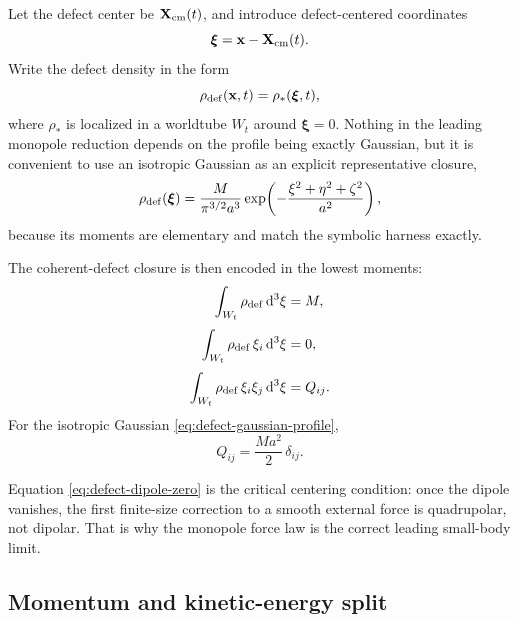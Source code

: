 \documentclass[11pt]{article}
\newcommand{\dd}{\mathrm d}
\newcommand{\x}{\mathbf x}
\begin{document}
Let the defect center be \(\mathbf X_{\rm cm}(t)\), and introduce defect-centered
coordinates
\begin{equation}
\boldsymbol{\xi}=\x-\mathbf X_{\rm cm}(t).
\end{equation}
Write the defect density in the form
\begin{equation}
\rho_{\rm def}(\x,t)=\rho_*(\boldsymbol{\xi},t),
\end{equation}
where \(\rho_*\) is localized in a worldtube \(W_t\) around \(\boldsymbol{\xi}=0\).
Nothing in the leading monopole reduction depends on the profile being exactly Gaussian,
but it is convenient to use an isotropic Gaussian as an explicit representative closure,
\begin{equation}
\rho_{\rm def}(\boldsymbol{\xi})
=
\frac{M}{\pi^{3/2}a^3}
\exp\!\left(-\frac{\xi^2+\eta^2+\zeta^2}{a^2}\right),
\label{eq:defect-gaussian-profile}
\end{equation}
because its moments are elementary and match the symbolic harness exactly.

The coherent-defect closure is then encoded in the lowest moments:
\begin{align}
\int_{W_t}\rho_{\rm def}\,\dd^3\xi &= M,
\label{eq:defect-mass-moment}
\\[3pt]
\int_{W_t}\rho_{\rm def}\,\xi_i\,\dd^3\xi &= 0,
\label{eq:defect-dipole-zero}
\\[3pt]
\int_{W_t}\rho_{\rm def}\,\xi_i\xi_j\,\dd^3\xi &= Q_{ij}.
\label{eq:defect-quadrupole-def}
\end{align}
For the isotropic Gaussian \eqref{eq:defect-gaussian-profile},
\begin{equation}
Q_{ij}=\frac{Ma^2}{2}\,\delta_{ij}.
\label{eq:defect-isotropic-second-moment}
\end{equation}

Equation \eqref{eq:defect-dipole-zero} is the critical centering condition: once the
dipole vanishes, the first finite-size correction to a smooth external force is
quadrupolar, not dipolar. That is why the monopole force law is the correct leading
small-body limit.

\subsection{Momentum and kinetic-energy split}
\label{sec:cm-split}
\end{document}
